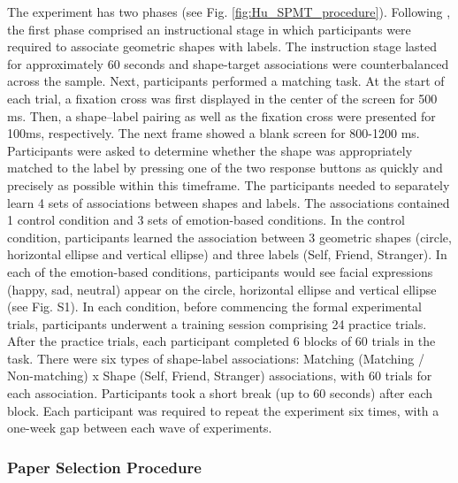 \documentclass[sn-apa]{sn-jnl}%
\theoremstyle{thmstyleone}%
\theoremstyle{thmstyletwo}%
\theoremstyle{thmstylethree}%
\begin{document}
The experiment has two phases (see Fig.  \ref{fig:Hu_SPMT_procedure}). Following \textcite{sui2012perceptual}, the first phase comprised an instructional stage in which participants were required to associate geometric shapes with labels. The instruction stage lasted for approximately 60 seconds and shape-target associations were counterbalanced across the sample. Next, participants performed a matching task. At the start of each trial, a fixation cross was first displayed in the center of the screen for 500 ms. Then, a shape–label pairing as well as the fixation cross were presented for 100ms, respectively. The next frame showed a blank screen for 800-1200 ms. Participants were asked to determine whether the shape was appropriately matched to the label by pressing one of the two response buttons as quickly and precisely as possible within this timeframe. 
The participants needed to separately learn 4 sets of associations between shapes and labels. The associations contained 1 control condition and 3 sets of emotion-based conditions. In the control condition, participants learned the association between 3 geometric shapes (circle, horizontal ellipse and vertical ellipse) and three labels (Self, Friend, Stranger). In each of the emotion-based conditions, participants would see facial expressions (happy, sad, neutral) appear on the circle, horizontal ellipse and vertical ellipse (see Fig. S1). In each condition, before commencing the formal experimental trials, participants underwent a training session comprising 24 practice trials. After the practice trials, each participant completed 6 blocks of 60 trials in the task. There were six types of shape-label associations: Matching (Matching / Non-matching) x Shape (Self, Friend, Stranger) associations, with 60 trials for each association. Participants took a short break (up to 60 seconds) after each block. Each participant was required to repeat the experiment six times, with a one-week gap between each wave of experiments. 

\subsubsection{Paper Selection Procedure}\label{subsec:paperselection}
\end{document}
